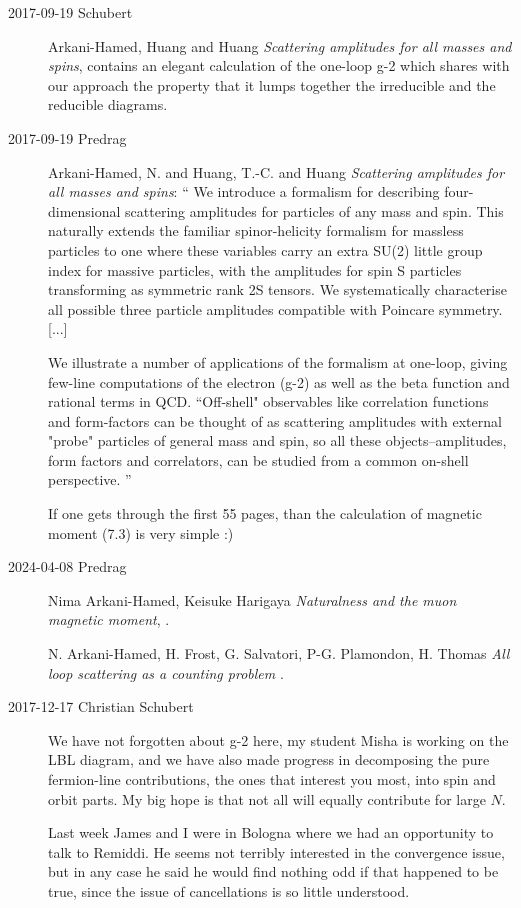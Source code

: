 \begin{description}
\item[2017-09-19 Schubert]
Arkani-Hamed, Huang and Huang
{\em Scattering amplitudes for all masses and spins}, 
 contains an
elegant calculation of the one-loop g-2 which shares with our approach the
property that it lumps together the irreducible and the reducible diagrams.

\item[2017-09-19 Predrag]
Arkani-Hamed, N. and Huang, T.-C. and Huang
{\em Scattering amplitudes for all masses and spins}: ``
We introduce a formalism for describing four-dimensional scattering
amplitudes for particles of any mass and spin. This naturally extends the
familiar spinor-helicity formalism for massless particles to one where these
variables carry an extra SU(2) little group index for massive particles, with
the amplitudes for spin S particles transforming as symmetric rank 2S
tensors. We systematically characterise all possible three particle
amplitudes compatible with Poincare symmetry. [...]

We illustrate a number of
applications of the formalism at one-loop, giving few-line computations of
the electron (g-2) as well as the beta function and rational terms in QCD.
``Off-shell" observables like correlation functions and form-factors can be
thought of as scattering amplitudes with external "probe" particles of
general mass and spin, so all these objects--amplitudes, form factors and
correlators, can be studied from a common on-shell perspective.
''

If one gets through the first 55 pages, than the calculation of magnetic
moment (7.3) is very simple :)

\item[2024-04-08 Predrag]
Nima Arkani-Hamed, Keisuke Harigaya
{\em Naturalness and the muon magnetic moment}, .


N. Arkani-Hamed, H. Frost, G. Salvatori, P-G. Plamondon, H. Thomas
{\em All loop scattering as a counting problem} 
.


 

\item[2017-12-17 Christian Schubert]
We have not forgotten about g-2 here, my student Misha is working on the
LBL diagram, and we have also made progress in decomposing the pure
fermion-line contributions, the ones that interest you most, into spin
and orbit parts. My big hope is that not all will equally contribute for
large $N$.

Last week James and I were in Bologna where we had an opportunity to talk
to Remiddi. He seems not terribly interested in the convergence issue,
but in any case he said he would find nothing odd if that happened to be
true, since the issue of cancellations is so little understood.


\end{description}
